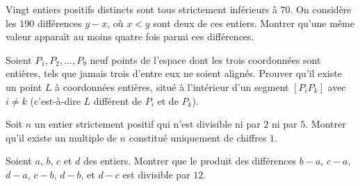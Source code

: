 \begin{exercise}
Vingt entiers positifs distincts sont tous strictement inférieurs à \( 70 \). On considère les \( 190 \) différences \( y-x \), où \( x<y \) sont deux de ces entiers. Montrer qu'une même valeur apparaît au moins quatre fois parmi ces différences.
\end{exercise}

\begin{exercise}
    Soient \( P_1, P_2, \ldots, P_9 \) neuf points de l'espace dont les trois coordonnées sont entières, tels que jamais trois d'entre eux ne soient alignés.
    Prouver qu'il existe un point \( L \) à coordonnées entières, situé à l'intérieur d'un segment \( [P_iP_k] \) avec \( i \neq k \) (c'est-à-dire \( L \) différent de \( P_i \) et de \( P_k \)).
\end{exercise}

\begin{exercise}
    Soit \( n \) un entier strictement positif qui n'est divisible ni par \( 2 \) ni par \( 5 \).
    Montrer qu'il existe un multiple de \( n \) constitué uniquement de chiffres \( 1 \).
\end{exercise}

\begin{exercise}
    Soient \( a \), \( b \), \( c \) et \( d \) des entiers.
    Montrer que le produit des différences \( b-a \), \( c-a \), \( d-a \), \( c-b \), \( d-b \), et \( d-c \) est divisible par \( 12 \).
\end{exercise}

